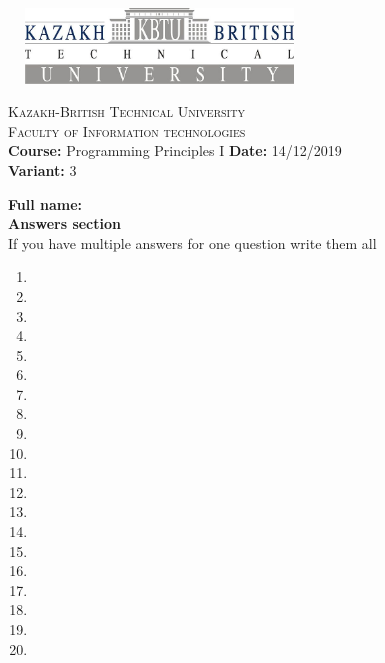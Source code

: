 \documentclass[10pt]{article}
\begin{document}
\begin{center}
\includegraphics[width=8cm, height=2cm]{kbtu.jpg}
\end{center}

\begin{center}
	\begin{minipage}{11.4cm}
		\begin{center}
				{\small \textsc{Kazakh-British Technical University}			\\
						  \textsc{Faculty of Information technologies} \\
                         \textbf{Course:} Programming Principles I \hspace{.65cm}
                         \textbf{Date:} 14/12/2019\\\textbf{Variant:} 3\\
                }
		\end{center}
	\end{minipage}
\end{center}
\textbf{
{Full name:}\\
{Answers section}\\
}
{If you have multiple answers for one question write them all}
\begin{multicols}{5}
\begin{enumerate}
\item \item \item \item \item \item \item \item \item \item \item \item \item \item \item \item \item \item \item \item
\end{enumerate}
\end{multicols}
\end{document}
